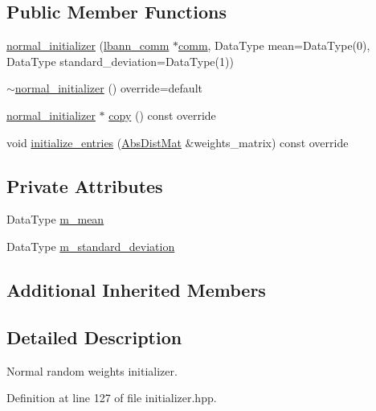 \subsection*{Public Member Functions}
\begin{DoxyCompactItemize}
\item 
\hyperlink{classlbann_1_1normal__initializer_a6db5f5aeedb4a314d36bc3106bda6b56}{normal\+\_\+initializer} (\hyperlink{classlbann_1_1lbann__comm}{lbann\+\_\+comm} $\ast$\hyperlink{file__io_8cpp_ab048c6f9fcbcfaa57ce68b00263dbebe}{comm}, Data\+Type mean=Data\+Type(0), Data\+Type standard\+\_\+deviation=Data\+Type(1))
\item 
\hyperlink{classlbann_1_1normal__initializer_a8177a93cb80b6fb916af8c9e2fec0c74}{$\sim$normal\+\_\+initializer} () override=default
\item 
\hyperlink{classlbann_1_1normal__initializer}{normal\+\_\+initializer} $\ast$ \hyperlink{classlbann_1_1normal__initializer_a154369b8513c5cf0edf201f1e8cc0887}{copy} () const override
\item 
void \hyperlink{classlbann_1_1normal__initializer_a3958aa3e88af76077cc7559eba0a5a17}{initialize\+\_\+entries} (\hyperlink{base_8hpp_a9a697a504ae84010e7439ffec862b470}{Abs\+Dist\+Mat} \&weights\+\_\+matrix) const override
\end{DoxyCompactItemize}
\subsection*{Private Attributes}
\begin{DoxyCompactItemize}
\item 
Data\+Type \hyperlink{classlbann_1_1normal__initializer_a1e431c0576605984c7e56d4ce905632e}{m\+\_\+mean}
\item 
Data\+Type \hyperlink{classlbann_1_1normal__initializer_a69cebd0d8f6db811c6195a1dac447a3e}{m\+\_\+standard\+\_\+deviation}
\end{DoxyCompactItemize}
\subsection*{Additional Inherited Members}


\subsection{Detailed Description}
Normal random weights initializer. 

Definition at line 127 of file initializer.\+hpp.



